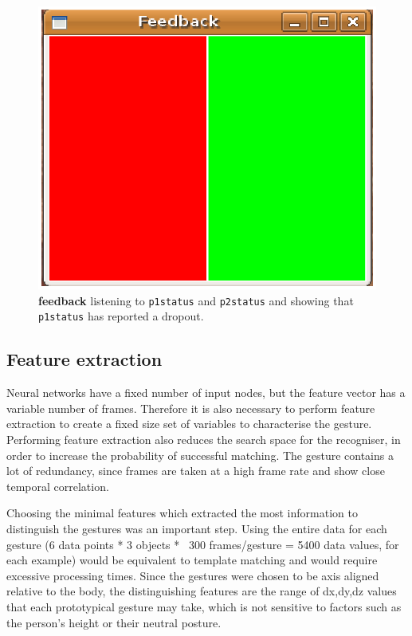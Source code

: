 \documentclass[12pt,a4,notitlepage]{report}
\renewcommand{\_}{\texttt{\symbol{95}}}
\newcommand{\<}{\texttt{\symbol{60}}}
\renewcommand{\>}{\texttt{\symbol{62}}}
\newcommand{\class}[1]{\textbf{#1}}
\newcommand{\scopendpoint}[1]{\texttt{#1}}
\begin{document}
\begin{figure}
\centering
\includegraphics[scale=0.4,angle=0]{images/feedback.ps}
\caption{\class{feedback} listening to \scopendpoint{p1status} and \scopendpoint{p2status} and showing that \scopendpoint{p1status} has reported a dropout.}
\label{feedback}
\end{figure}

\subsection{Feature extraction}

Neural networks have a fixed number of input nodes, but the feature vector has a variable number of frames. Therefore it is also necessary to perform feature extraction to create a fixed size set of variables to characterise the gesture. Performing feature extraction also reduces the search space for the recogniser, in order to increase the probability of successful matching. The gesture contains a lot of redundancy, since frames are taken at a high frame rate and show close temporal correlation.

Choosing the minimal features which extracted the most information to distinguish the gestures was an important step. Using the entire data for each gesture (6 data points * 3 objects * ~300 frames/gesture = 5400 data values, for each example) would be equivalent to template matching and would require excessive processing times. Since the gestures were chosen to be axis aligned relative to the body, the distinguishing features are the range of dx,dy,dz values that each prototypical gesture may take, which is not sensitive to factors such as the person's height or their neutral posture.
\end{document}
